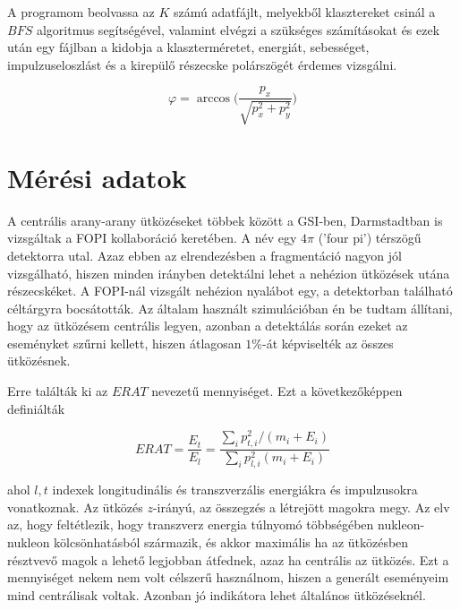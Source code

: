 \documentclass[a4paper,12pt]{article}
\begin{document}
\par A programom beolvassa az $K$ számú adatfájlt, melyekből klasztereket csinál a $BFS$ algoritmus segítségével, valamint elvégzi a szükséges számításokat és ezek után egy fájlban a kidobja a klaszterméretet, energiát, sebességet, impulzuseloszlást és a kirepülő részecske polárszögét érdemes vizsgálni.

\vspace{5mm}

\begin{equation}
\varphi = \arccos\Big(\frac{p_{x}}{\sqrt{p_{x}^{2} + p_{y}^{2}}}\Big)
\end{equation}

\vspace{5mm}

\section{ Mérési adatok}

\par A centrális arany-arany ütközéseket többek között a GSI-ben, Darmstadtban is vizsgáltak a FOPI kollaboráció keretében. A név egy $4\pi$ ('four pi') térszögű detektorra utal. Azaz ebben az elrendezésben a fragmentáció nagyon jól vizsgálható, hiszen minden irányben detektálni lehet a nehézion ütközések utána részecskéket. A FOPI-nál vizsgált nehézion nyalábot egy, a detektorban található céltárgyra bocsátották. Az általam használt szimulációban én be tudtam állítani, hogy az ütközésem centrális legyen, azonban a detektálás során ezeket az eseményket szűrni kellett, hiszen átlagosan $1\%$-át képviselték az összes ütközésnek.

\vspace{5mm}

\par Erre találták ki az $ERAT$ nevezetű mennyiséget. Ezt a következőképpen definiálták

\vspace{5mm}

\begin{equation}
ERAT = \frac{E_{t}}{E_{l}} = \frac{\sum_{i} p_{t,i}^{2}/(m_{i} + E_{i})}{\sum_{i} p_{l,i}^{2}(m_{i} + E_{i})}
\end{equation}

\vspace{5mm}

\par ahol $l,t$ indexek longitudinális és transzverzális energiákra és impulzusokra vonatkoznak. Az ütközés $z$-irányú, az összegzés a létrejött magokra megy. Az elv az, hogy feltétlezik, hogy transzverz energia túlnyomó többségében nukleon-nukleon kölcsönhatásból származik, és akkor maximális ha az ütközésben résztvevő magok a lehető legjobban átfednek, azaz ha centrális az ütközés. Ezt a mennyiséget nekem nem volt célszerű használnom, hiszen a generált eseményeim mind centrálisak voltak. Azonban jó indikátora lehet általános ütközéseknél.
\end{document}
